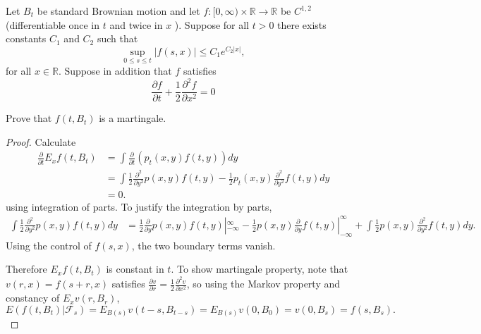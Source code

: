 \begin{problem}
	Let $B_t$ be standard Brownian motion and let $f:[0, \infty) \times \mathbb{R} \rightarrow \mathbb{R}$ be $C^{1,2}$ (differentiable once in $t$ and twice in $x$ ). Suppose for all $t>0$ there exists constants $C_1$ and $C_2$ such that
\[
\sup _{0 \leq s \leq t}|f(s, x)| \leq C_1 e^{C_2|x|},
\]
for all $x \in \mathbb{R}$. Suppose in addition that $f$ satisfies
\[
\frac{\partial f}{\partial t}+\frac{1}{2} \frac{\partial^2 f}{\partial x^2}=0
\]

Prove that $f\left(t, B_t\right)$ is a martingale.
\end{problem}
\begin{proof}
	Calculate
	\begin{align*}
		\frac{\partial }{\partial t} E_x f(t, B_t)
		&= \int \frac{\partial }{\partial t} \left( p_t(x,y) f(t,y) \right) dy \\
		&= \int \frac{1}{2} \frac{\partial ^2}{\partial y^2} p(x,y) f(t,y) - \frac{1}{2} p_t(x,y) \frac{\partial ^2}{\partial y^2} f(t,y) dy \\
		&= 0
	.\end{align*}
	using integration of parts. To justify the integration by parts,
	\begin{align*}
		\int \frac{1}{2}\frac{\partial ^2}{\partial y^2} p(x,y) f(t,y) dy
		&= \frac{1}{2} \frac{\partial }{\partial y} p(x,y) f(t,y) |_{- \infty }^{\infty } - \frac{1}{2} p(x,y) \frac{\partial }{\partial y} f(t,y) |_{- \infty }^\infty + \int \frac{1}{2} p(x,y) \frac{\partial ^2}{\partial y^2} f(t,y) dy
	.\end{align*}
	Using the control of $f(s,x)$, the two boundary terms vanish.

	Therefore $E_x f(t, B_t)$ is constant in $t$. To show martingale property, note that $v(r, x) = f(s + r, x)$ satisfies $\frac{\partial v}{\partial r} = \frac{1}{2} \frac{\partial ^2v}{\partial x^2} $, so using the Markov property and constancy of  $E_x v(r, B_r)$, 
	\[
		E\left( f(t , B_{t })|\mathcal{F}_s \right) 
		= E_{B(s)} v\left( t-s, B_{t-s} \right) 
		= E_{B(s)}v(0, B_0) = v(0, B_s) = f( s, B_s)
	.\] 
\end{proof}

